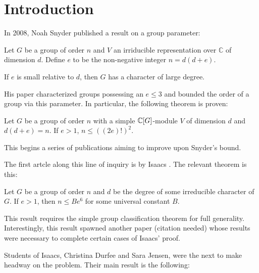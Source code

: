 \documentclass[main.tex]{subfiles}
\begin{document}
\section{Introduction}

In 2008, Noah Snyder published \cite{snyderarticle} a result on a group parameter:

\hss

\begin{definition}
Let $G$ be a group of order $n$ and $V$ an irriducible representation over $\mathbb{C}$ of dimension $d$. Define $e$ to be the non-negative integer $n = d(d + e)$.
\end{definition}

\hss

If $e$ is small relative to $d$, then $G$ has a character of large degree.

His paper characterized groups possessing an $e \le 3$ and bounded the order of a group via this parameter. In particular, the following theorem is proven:

\hss

\begin{theorem}
Let $G$ be a group of order $n$ with a simple $\mathbb{C}[G]$-module $V$ of dimension $d$ and $d(d+e) = n$. If $e > 1$, $n \le ((2e)!)^2$.
\end{theorem}

\hss

This begins a series of publications aiming to improve upon Snyder's bound.

The first artcle along this line of inquiry is by Isaacs \cite{isaacsarticle}. The relevant theorem is this:

\hss

\begin{theorem} Let $G$ be a group of order $n$ and $d$ be the degree of some irreducible character of $G$. If $e > 1$, then $n \le Be^6$ for some universal constant $B$.
\end{theorem}

\hss

This result requires the simple group classification theorem for full generality. Interestingly, this result spawned another paper (citation needed) whose results were necessary to complete certain cases of Isaacs' proof.

Students of Isaacs, Christina Durfee and Sara Jensen, were the next to make headway on the problem. Their main result is the following:
\end{document}
